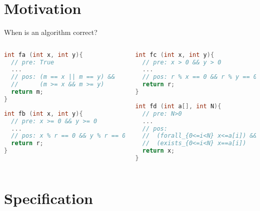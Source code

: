 \documentclass[aspectratio=169]{beamer}
\begin{document}
\frame[plain]{\titlepage}


\section{Motivation}


\begin{frame}[fragile]{When is an algorithm correct?}
~\\[-8mm]
\begin{columns}
\begin{column}{0.48\textwidth}
\begin{lstlisting}[language=C++]
int fa (int x, int y){
  // pre: True
  ...
  // pos: (m == x || m == y) &&
  //      (m >= x && m >= y)
  return m;
}
\end{lstlisting}
\begin{lstlisting}[language=C++]
int fb (int x, int y){
  // pre: x >= 0 && y >= 0
  ...
  // pos: x % r == 0 && y % r == 0
  return r;
}
\end{lstlisting}
\end{column}
\begin{column}{0.48\textwidth}
\begin{lstlisting}[language=C++]
int fc (int x, int y){
  // pre: x > 0 && y > 0
  ...
  // pos: r % x == 0 && r % y == 0
  return r;
}
\end{lstlisting}
\begin{lstlisting}[language=C++]
int fd (int a[], int N){
  // pre: N>0
  ...
  // pos:
  //  (forall_{0<=i<N} x<=a[i]) &&
  //  (exists_{0<=i<N} x==a[i])
  return x;
}
\end{lstlisting}
\end{column}
\end{columns}
\end{frame}



\section{Specification}
\end{document}
